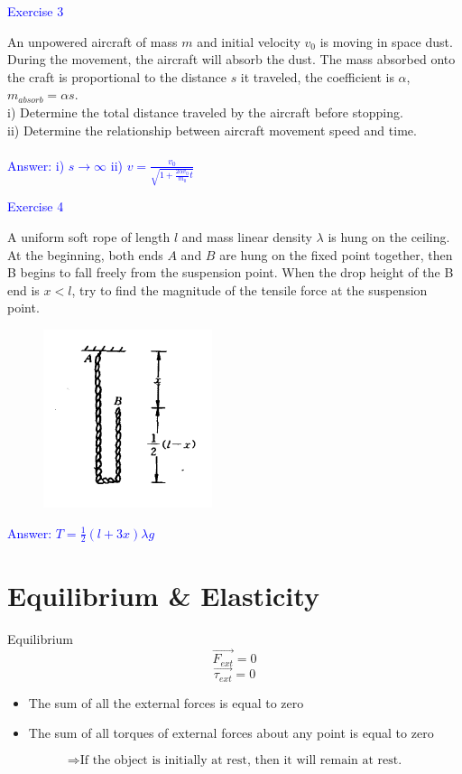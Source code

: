 \documentclass{beamer}
\begin{document}
\begin{frame}
\textcolor{blue}{Exercise 3}

An unpowered aircraft of mass $m$ and initial velocity $v_0$ is moving in space dust. During the movement, the aircraft will absorb the dust. The mass absorbed onto the craft is proportional to the distance $s$ it traveled, the coefficient is $\alpha$, $m_{absorb} = \alpha s$.\\
i) Determine the total distance traveled by the aircraft before stopping.\\
ii) Determine the relationship between aircraft movement speed and time.\\
~\\
\textcolor{blue}{Answer: i) $s\rightarrow \infty$ ii) $v = \frac{v_0}{\sqrt{1+\frac{2\alpha v_0}{m_0}t}}$}
\end{frame}

\begin{frame}
\textcolor{blue}{Exercise 4}

A uniform soft rope of length $l$ and mass linear density $\lambda$ is hung on the ceiling. At the beginning, both ends $A$ and $B$ are hung on the fixed point together, then B begins to fall freely from the suspension point. When the drop height of the B end is $x < l$, try to find the magnitude of the tensile force at the suspension point.

\begin{figure}[htbp]
\centering
\includegraphics[width=0.3 \linewidth, angle =0]{string.png}
\label{fig:100}
\end{figure}
\textcolor{blue}{Answer: $T = \frac{1}{2}(l+3x)\lambda g$}
\end{frame}

\section{Equilibrium \& Elasticity}
\begin{frame}
  \begin{block}{Equilibrium}
    $$\vec{F_{ext}} = 0$$
    $$\vec{\tau_{ext}} = 0$$
  \end{block}
  \begin{itemize}
    \item The sum of all the external forces is equal to zero
    \item The sum of all torques of external forces about any point is equal to zero
  \end{itemize}
  $$\Rightarrow \text{If the object is initially at rest, then it will remain at rest.}$$
\end{frame}
\end{document}
